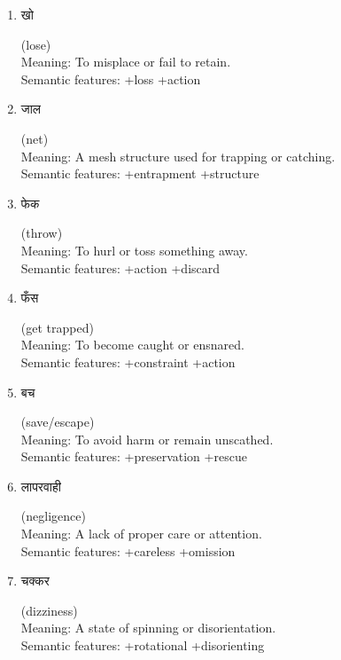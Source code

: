\documentclass{article}
\begin{document}
\begin{enumerate}
\item \begin{hindi} खो \end{hindi} (lose) \\
Meaning: To misplace or fail to retain. \\
Semantic features: +loss +action

\item \begin{hindi} जाल \end{hindi} (net) \\
Meaning: A mesh structure used for trapping or catching. \\
Semantic features: +entrapment +structure

\item \begin{hindi} फेक \end{hindi} (throw) \\
Meaning: To hurl or toss something away. \\
Semantic features: +action +discard

\item \begin{hindi} फँस \end{hindi} (get trapped) \\
Meaning: To become caught or ensnared. \\
Semantic features: +constraint +action

\item \begin{hindi} बच \end{hindi} (save/escape) \\
Meaning: To avoid harm or remain unscathed. \\
Semantic features: +preservation +rescue

\item \begin{hindi} लापरवाही \end{hindi} (negligence) \\
Meaning: A lack of proper care or attention. \\
Semantic features: +careless +omission

\item \begin{hindi} चक्कर \end{hindi} (dizziness) \\
Meaning: A state of spinning or disorientation. \\
Semantic features: +rotational +disorienting


\end{enumerate}
\end{document}
